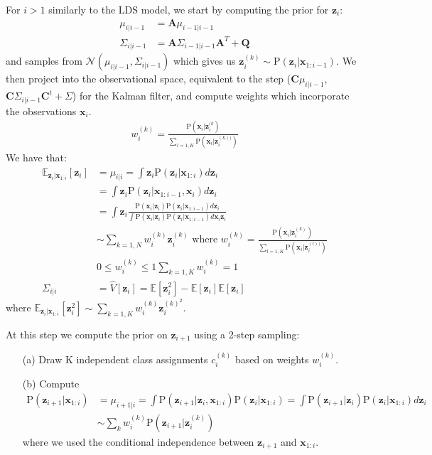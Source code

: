 \documentclass[12pt]{article}
\newcommand{\p}[1]{\mathrm{P}\left(#1 \right)}
\newcommand{\matr}[1]{\bm{#1}}     %
\newcommand{\vect}[1]{\mathbf{#1}}
\begin{document}
For $i > 1$ similarly to the LDS  model, we start by computing the prior for $\vect{z}_i$:
\begin{align*}
			\mu_{i|i-1}		&=  \matr{A}  \mu_{i-1| i-1} \\
			\Sigma_{i|i-1}	&=	\matr{A} \Sigma_{i-1|i-1}	\matr{A}^T + \matr{Q} 
 \end{align*}
and samples from $\mathcal{N}(\mu_{i|i-1}, \Sigma_{i|i-1})$ which gives us $\vect{z}_i^{(k)} \sim \p{\vect{z}_i | \vect{x}_{1:i-1}}$.
We then project into the observational space, equivalent to the step ($\matr{C} \mu_{i|i-1}$, $\matr{C} \Sigma_{i|i-1} \matr{C}^t + \Sigma$) for the Kalman filter, and compute weights which incorporate the observations $\vect{x}_i$.
\begin{align*}
			w_i^{(k)} =\frac{ \p{ \vect{x}_i | \vect{z}_i^{(k}} } {\sum_{l=1,K} \p{\vect{x}_i | \vect{z}_i^{(k))} }}
\end{align*}
We have that:
\begin{align*}
	\mathbb{E}_{\vect{z}_i | \vect{x}_{1:i}}[\mathbf{z}_i]	&= 	\mu_{i|i} = \int  \vect{z}_i \p{\vect{z}_i | \vect{x}_{1:i}}   d \vect{z}_{i}  \\
								 	&=	\int  \vect{z}_i \p{\vect{z}_i | \vect{x}_{1:i-1}, \vect{x}_i}   d \vect{z}_{i} \\
									&= 	\int  \vect{z}_i  \frac{\p{\vect{x}_i | \vect{z}_i} \p{ \vect{z}_i | \vect{x}_{1:i-1}} d \vect{z}_{i} } { \int \p{\vect{x}_i | \vect{z}_i} \p{ \vect{z}_i | \vect{x}_{1:i-1}} d  \vect{x}_{i} \vect{z}_{i}} \\
									&\sim \sum_{k=1,N} w_i^{(k)}  \vect{z}_i^{(k)} \text{ where } w_i^{(k)} = \frac{ \p{ \vect{x}_i | \vect{z}_i^{(k)}} } {\sum_{l=1,K} \p{\vect{x}_i | \vect{z}_i^{(l))} }}	\\
									&	0 \le w_i^{(k)} \le 1 \sum_{k=1,K}  w_i^{(k)} = 1\\
						\Sigma_{i|i}	&=  \hat V[\vect{z}_i] = \mathbb{E}[\vect{z}_i^{2}] - \mathbb{E}[\vect{z}_i] \mathbb{E}[\vect{z}_i]					
\end{align*}
where $\mathbb{E}_{\vect{z}_i | \vect{x}_{1:i}} [\vect{z}_i^2] \sim \sum_{k=1,K} w_i^{(k)}  \vect{z}_i^{(k)^2}$.

At this step we compute the prior on $\vect{z}_{i+1}$ using a 2-step sampling:
\begin{enumerate}
	\item [(a)] Draw K independent class assignments $c_i^{(k)}$ based on weights $w_i^{(k)}$. 
	\item [(b)] Compute 
		\begin{align*}	
			\p{ \vect{z}_{i+1} | \vect{x}_{1:i} } 	&=  \mu_{i+1| i} = \int \p{\vect{z}_{i+1} |\vect{z}_{i},  \vect{x}_{1:i}} \p{\vect{z}_{i} | \vect{x}_{1:i}}   = \int \p{\vect{z}_{i+1} |\vect{z}_{i}} \p{\vect{z}_{i} |\vect{x}_{1:i}} d \vect{z}_{i} \\
										&\sim \sum_k w_i^{(k)}  \p{ \vect{z}_{i+1} | \vect{z}_{i}^{(k)} } 
		\end{align*}	
		where we used the conditional independence between $\vect{z}_{i+1}$ and $\vect{x}_{1:i}$.		
\end{enumerate}
\end{document}
